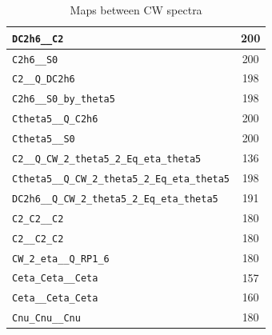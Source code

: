 \begin{table}
\begin{tabular}{|l|c|}
\texttt{DC2h6\_\_C2} & 200\\\hline
\texttt{C2h6\_\_S0} & 200\\\hline
\texttt{C2\_\_Q\_DC2h6} & 198\\\hline
\texttt{C2h6\_\_S0\_by\_theta5} & 198\\\hline
\texttt{Ctheta5\_\_Q\_C2h6} & 200\\\hline
\texttt{Ctheta5\_\_S0} & 200\\\hline
\texttt{C2\_\_Q\_CW\_2\_theta5\_2\_Eq\_eta\_theta5} & 136\\\hline
\texttt{Ctheta5\_\_Q\_CW\_2\_theta5\_2\_Eq\_eta\_theta5} & 198\\\hline
\texttt{DC2h6\_\_Q\_CW\_2\_theta5\_2\_Eq\_eta\_theta5} & 191\\\hline
\texttt{C2\_C2\_\_C2} & 180\\\hline
\texttt{C2\_\_C2\_C2} & 180\\\hline
\texttt{CW\_2\_eta\_\_Q\_RP1\_6} & 180\\\hline
\texttt{Ceta\_Ceta\_\_Ceta} & 157\\\hline
\texttt{Ceta\_\_Ceta\_Ceta} & 160\\\hline
\texttt{Cnu\_Cnu\_\_Cnu} & 180\\\hline
\end{tabular}\caption{Maps between CW spectra}
\end{table}

